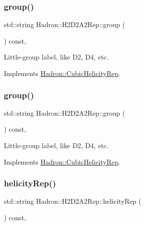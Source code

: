 \subsubsection{\texorpdfstring{group()}{group()}\hspace{0.1cm}{\footnotesize\ttfamily [2/3]}}
{\footnotesize\ttfamily std\+::string Hadron\+::\+H2\+D2\+A2\+Rep\+::group (\begin{DoxyParamCaption}{ }\end{DoxyParamCaption}) const\hspace{0.3cm}{\ttfamily [inline]}, {\ttfamily [virtual]}}

Little-\/group label, like D2, D4, etc. 

Implements \mbox{\hyperlink{structHadron_1_1CubicHelicityRep_a101a7d76cd8ccdad0f272db44b766113}{Hadron\+::\+Cubic\+Helicity\+Rep}}.

\mbox{\label{structHadron_1_1H2D2A2Rep_a03d366c9b575134ad5bfdba3884b4181}} 
\subsubsection{\texorpdfstring{group()}{group()}\hspace{0.1cm}{\footnotesize\ttfamily [3/3]}}
{\footnotesize\ttfamily std\+::string Hadron\+::\+H2\+D2\+A2\+Rep\+::group (\begin{DoxyParamCaption}{ }\end{DoxyParamCaption}) const\hspace{0.3cm}{\ttfamily [inline]}, {\ttfamily [virtual]}}

Little-\/group label, like D2, D4, etc. 

Implements \mbox{\hyperlink{structHadron_1_1CubicHelicityRep_a101a7d76cd8ccdad0f272db44b766113}{Hadron\+::\+Cubic\+Helicity\+Rep}}.

\mbox{\label{structHadron_1_1H2D2A2Rep_adfa1f1bca5e0e98eb2eca39372ca7245}} 
\subsubsection{\texorpdfstring{helicityRep()}{helicityRep()}\hspace{0.1cm}{\footnotesize\ttfamily [1/2]}}
{\footnotesize\ttfamily std\+::string Hadron\+::\+H2\+D2\+A2\+Rep\+::helicity\+Rep (\begin{DoxyParamCaption}{ }\end{DoxyParamCaption}) const\hspace{0.3cm}{\ttfamily [inline]}, {\ttfamily [virtual]}}

